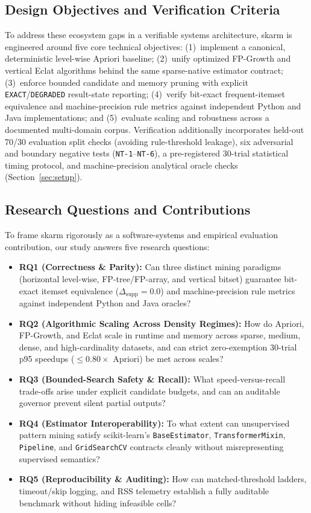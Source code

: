 \documentclass[journal,a4paper]{IEEEtran}
\newcommand{\skarm}{skarm\xspace}
\begin{document}
\subsection{Design Objectives and Verification Criteria}
\label{sec:objectives}
To address these ecosystem gaps in a verifiable systems architecture, \skarm
is engineered around five core technical objectives:
(1)~implement a canonical, deterministic level-wise Apriori baseline;
(2)~unify optimized FP-Growth and vertical Eclat algorithms behind the same
sparse-native estimator contract; (3)~enforce bounded candidate and memory
pruning with explicit \texttt{EXACT}/\texttt{DEGRADED} result-state
reporting; (4)~verify bit-exact frequent-itemset equivalence and
machine-precision rule metrics against independent Python and Java
implementations; and (5)~evaluate scaling and robustness across a
documented multi-domain corpus. Verification additionally incorporates
held-out 70/30 evaluation split checks (avoiding rule-threshold leakage),
six adversarial and boundary negative tests (\texttt{NT-1}--\texttt{NT-6}),
a pre-registered 30-trial statistical timing protocol, and machine-precision
analytical oracle checks (Section~\ref{sec:setup}).

\subsection{Research Questions and Contributions}
To frame \skarm rigorously as a software-systems and empirical evaluation
contribution, our study answers five research questions:
\begin{itemize}
  \item \textbf{RQ1 (Correctness \& Parity):} Can three distinct mining
  paradigms (horizontal level-wise, FP-tree/FP-array, and vertical bitset)
  guarantee bit-exact itemset equivalence ($\Delta_{\mathrm{supp}} = 0.0$)
  and machine-precision rule metrics against independent Python and Java
  oracles?
  \item \textbf{RQ2 (Algorithmic Scaling Across Density Regimes):} How do
  Apriori, FP-Growth, and Eclat scale in runtime and memory across sparse,
  medium, dense, and high-cardinality datasets, and can strict zero-exemption
  30-trial p95 speedups ($\le 0.80\times$ Apriori) be met across scales?
  \item \textbf{RQ3 (Bounded-Search Safety \& Recall):} What speed-versus-recall
  trade-offs arise under explicit candidate budgets, and can an auditable
  governor prevent silent partial outputs?
  \item \textbf{RQ4 (Estimator Interoperability):} To what extent can
  unsupervised pattern mining satisfy scikit-learn's \texttt{BaseEstimator},
  \texttt{TransformerMixin}, \texttt{Pipeline}, and \texttt{GridSearchCV}
  contracts cleanly without misrepresenting supervised semantics?
  \item \textbf{RQ5 (Reproducibility \& Auditing):} How can matched-threshold
  ladders, timeout/skip logging, and RSS telemetry establish a fully
  auditable benchmark without hiding infeasible cells?
\end{itemize}
\end{document}
